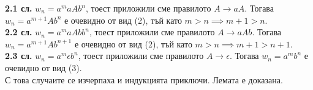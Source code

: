 \documentclass{article}
\begin{document}
        \hspace{15pt}\textbf{2.1 сл.} $w_n = a^maAb^n$, тоест приложили сме правилото
        $\boxed{A \rightarrow aA}$. Тогава $w_n = a^{m+1}Ab^n$ е очевидно от вид (2),
        тъй като $m > n \implies m+1 > n$. \\
        \hspace{15pt}\textbf{2.2 сл.} $w_n = a^maAbb^n$, тоест приложили сме правилото
        $\boxed{A \rightarrow aAb}$. Тогава $w_n = a^{m+1}Ab^{n+1}$ е очевидно от вид
        (2), тъй като $m > n \implies m+1 > n+1$. \\
        \hspace{15pt}\textbf{2.3 сл.} $w_n = a^m\epsilon b^n$, тоест приложили сме
        правилото $\boxed{A \rightarrow \epsilon}$. Тогава $w_n = a^mb^n$ е очевидно
        от вид (3). \\
        С това случаите се изчерпаха и индукцията приключи. Лемата е доказана.

        \vspace{15pt} 
\end{document}
